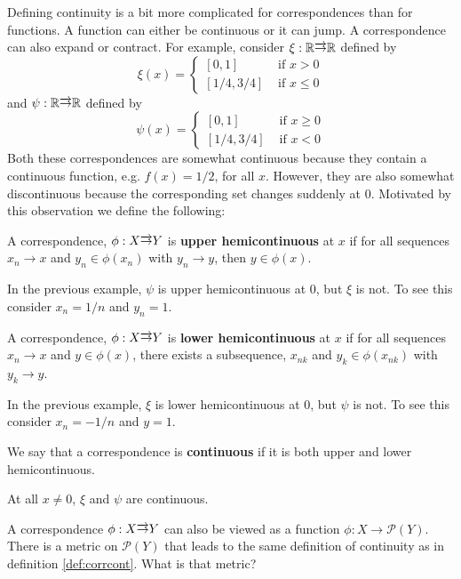 Defining continuity is a bit more complicated for correspondences than
for functions. A function can either be continuous or it can jump. A
correspondence can also expand or contract. For example, consider
$\xi:\mathbb{R} \overrightarrow{\rightarrow} \mathbb{R}$ defined by 
\[ \xi(x) = \begin{cases} 
  [0,1] & \text{ if } x > 0 \\
  [1/4,3/4] & \text{ if } x \leq 0 
\end{cases} \]
and $\psi: \mathbb{R} \overrightarrow{\rightarrow} \mathbb{R}$ defined by
\[ \psi(x) = \begin{cases} 
  [0,1] & \text{ if } x \geq 0 \\
  [1/4,3/4] & \text{ if } x < 0 
\end{cases} \]
Both these correspondences are somewhat continuous because they
contain a continuous function, e.g. $f(x) = 1/2$,  for all
$x$. However, they are also somewhat discontinuous because the
corresponding set changes suddenly at $0$. Motivated by this
observation we define the following:
\begin{definition}
  A correspondence, $\phi: X \overrightarrow{\rightarrow} Y$ is \textbf{upper
    hemicontinuous} at $x$ if for all sequences $x_n \to x$ and $y_n
  \in \phi(x_n)$ with $y_n \to y$, then $y \in \phi(x)$.
\end{definition}
In the previous example, $\psi$ is upper hemicontinuous at $0$, but
$\xi$ is not. To see this consider $x_n = 1/n$ and $y_n = 1$.
\begin{definition}
  A correspondence, $\phi: X \overrightarrow{\rightarrow} Y$ is \textbf{lower
    hemicontinuous} at $x$ if for all sequences $x_n \to x$ and $y \in
  \phi(x)$, there exists a subsequence, $x_{nk}$ and $y_k \in
  \phi(x_{nk})$ with $y_k \to y$.
\end{definition}
In the previous example, $\xi$ is lower hemicontinuous at $0$, but
$\psi$ is not. To see this consider $x_n = -1/n$ and $y = 1$. 
\begin{definition}\label{def:corrcont}
  We say that a correspondence is \textbf{continuous} if it is both
  upper and lower hemicontinuous.
\end{definition}
At all $x \neq 0$, $\xi$ and $\psi$ are continuous.

\begin{exercise}
  A correspondence $\phi:X \overrightarrow{\rightarrow} Y$ can also be viewed as a function
  $\phi:X \to \mathcal{P}(Y)$. There is a metric on $\mathcal{P}(Y)$
  that leads to the same definition of continuity as in
  definition \ref{def:corrcont}. What is that metric?
\end{exercise}





